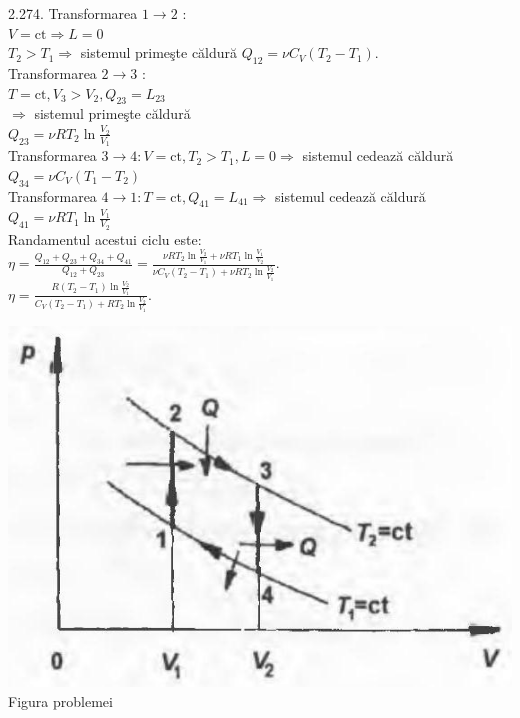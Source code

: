 2.274. Transformarea $1 \rightarrow 2$ :\\ $V=\mathrm{ct} \Rightarrow L=0$\\ $T_{2}>T_{1} \Rightarrow$ sistemul primeşte căldură $Q_{12}=\nu C_{V}\left(T_{2}-T_{1}\right)$.\\ Transformarea $2 \rightarrow 3$ :\\ $T=\mathrm{ct}, V_{3}>V_{2}, Q_{23}=L_{23}$\\ $\Rightarrow$ sistemul primeşte căldură\\ $Q_{23}=\nu R T_{2} \ln \frac{V_{2}}{V_{1}}$\\ Transformarea $3 \rightarrow 4: V=\mathrm{ct}, T_{2}>T_{1}, L=0 \Rightarrow$ sistemul cedează căldură\\ $Q_{34}=\nu C_{V}\left(T_{1}-T_{2}\right)$\\ Transformarea $4 \rightarrow 1: T=\mathrm{ct}, Q_{41}=L_{41} \Rightarrow$ sistemul cedează căldură\\ $Q_{41}=\nu R T_{1} \ln \frac{V_{1}}{V_{2}}$\\ Randamentul acestui ciclu este:\\ $\eta=\frac{Q_{12}+Q_{23}+Q_{34}+Q_{41}}{Q_{12}+Q_{23}}=\frac{\nu R T_{2} \ln \frac{V_{2}}{V_{1}}+\nu R T_{1} \ln \frac{V_{1}}{V_{2}}}{\nu C_{V}\left(T_{2}-T_{1}\right)+\nu R T_{2} \ln \frac{V_{2}}{V_{1}}}$.\\ $\eta=\frac{R\left(T_{2}-T_{1}\right) \ln \frac{V_{2}}{V_{1}}}{C_{V}\left(T_{2}-T_{1}\right)+R T_{2} \ln \frac{V_{2}}{V_{1}}} $.\\ \begin{center} \includegraphics[width=0.4\linewidth]{images/2025_07_01_5b3ff9fa0d508c8e9f17g-330}\\ Figura problemei \end{center}\\

